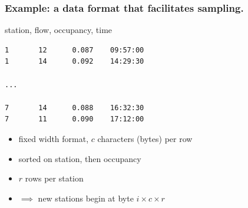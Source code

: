 \documentclass{beamer}
\begin{document}
\begin{frame}[fragile]

    \frametitle{Example: a data format that facilitates sampling.}


station, flow, occupancy, time
\begin{verbatim}
1       12      0.087    09:57:00
1       14      0.092    14:29:30

...

7       14      0.088    16:32:30
7       11      0.090    17:12:00
\end{verbatim}

    \begin{itemize}

        \item fixed width format, $c$ characters (bytes) per row
        \item sorted on station, then occupancy
        \item $r$ rows per station
        \item $\implies$ new stations begin at byte $i \times c \times r$

    \end{itemize}

%
%
%
%
%
%
%
%
%
%
%
%    
%



\end{frame}
\end{document}
